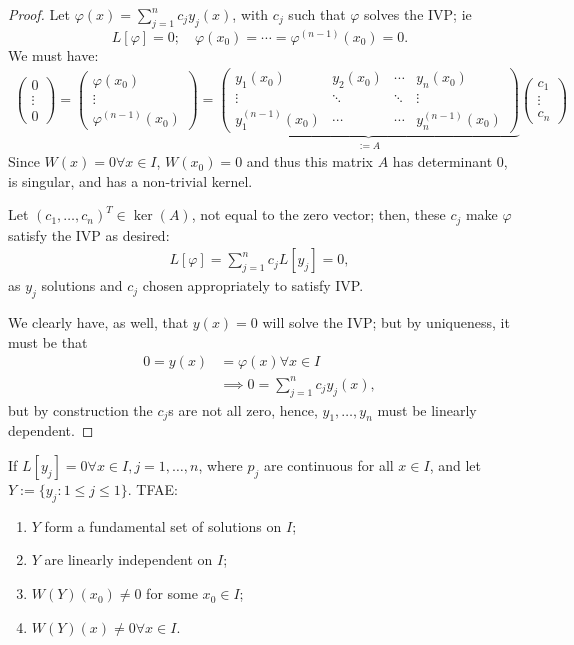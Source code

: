 \begin{proof}
Let $\varphi(x) = \sum_{j=1}^{n} c_j y_j(x)$, with $c_j$ such that $\varphi$ solves the IVP; ie \[
L[\varphi] = 0; \quad \varphi(x_0) = \cdots = \varphi^{(n-1)}(x_0) = 0.
\]
We must have:
\begin{align*}
    \begin{pmatrix}
        0\\
        \vdots \\
        0
    \end{pmatrix} = \begin{pmatrix}
        \varphi(x_0)\\
        \vdots\\
        \varphi^{(n-1)}(x_0)
    \end{pmatrix} = \underbrace{\begin{pmatrix}
        y_1(x_0) & y_2(x_0) & \cdots & y_n(x_0)\\
        \vdots & \ddots & \ddots & \vdots \\
        y_1^{(n-1)}(x_0) & \cdots & \cdots & y_n^{(n-1)}(x_0)
    \end{pmatrix}}_{:=A} \begin{pmatrix}
        c_1\\
        \vdots\\
        c_n
    \end{pmatrix}
\end{align*} 
Since $W(x) = 0 \forall x \in I$, $W(x_0)= 0 $ and thus this matrix $A$ has determinant $0$, is singular, and has a non-trivial kernel.

Let $(c_1, \dots, c_n)^T \in \ker(A)$, not equal to the zero vector; then, these $c_j$ make $\varphi$ satisfy the IVP as desired:
\begin{align*}
    L[\varphi] =\sum_{j=1}^n c_j L[y_j] = 0,
\end{align*}
as $y_j$ solutions and $c_j$ chosen appropriately to satisfy IVP. 

We clearly have, as well, that $y(x) = 0$ will solve the IVP; but by uniqueness, it must be that \begin{align*}
    0 = y(x) &= \varphi(x) \forall x \in I\\
    &\implies 0 = \sum_{j=1}^n c_j y_j(x),
\end{align*}
but by construction the $c_j$s are not all zero, hence, $y_1, \dots, y_n$ must be linearly dependent.
\end{proof}

\begin{corollary}
    If $L[y_j] = 0 \forall x \in I, j= 1, \dots, n$, where $p_j$ are continuous for all $x \in I$, and let $Y := \{y_j : 1 \leq j \leq 1\}$. TFAE:
    \begin{enumerate}
        \item $Y$ form a fundamental set of solutions on $I$;
        \item $Y$ are linearly independent on $I$;
        \item $W(Y)(x_0) \neq 0$ for some $x_0 \in I$;
        \item $W(Y)(x) \neq 0 \forall x \in I$.
    \end{enumerate}
\end{corollary}

